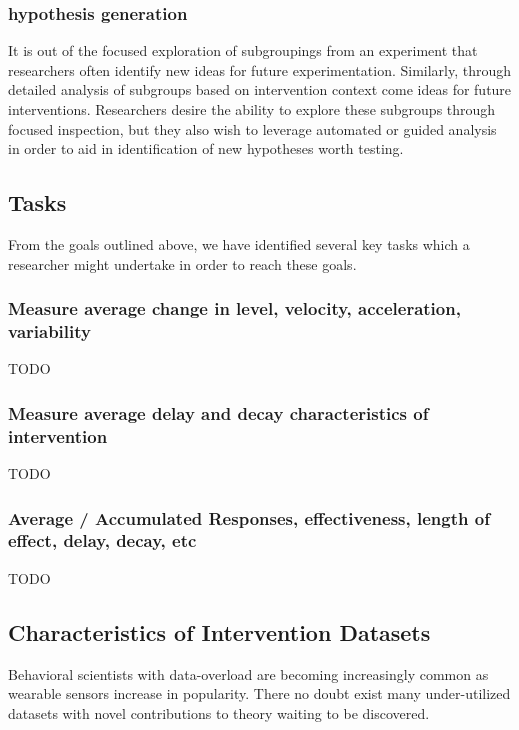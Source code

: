 \documentclass[review,journal]{vgtc}         %
\begin{document}
\subsubsection{hypothesis generation}
It is out of the focused exploration of subgroupings from an experiment that researchers often identify new ideas for future experimentation.
Similarly, through detailed analysis of subgroups based on intervention context come ideas for future interventions.
Researchers desire the ability to explore these subgroups through focused inspection, but they also wish to leverage automated or guided analysis in order to aid in identification of new hypotheses worth testing.

\subsection{Tasks}
From the goals outlined above, we have identified several key tasks which a researcher might undertake in order to reach these goals.

\subsubsection{Measure average change in level, velocity, acceleration, variability}
TODO

\subsubsection{Measure average delay and decay characteristics of intervention}
TODO

\subsubsection{Average / Accumulated Responses, effectiveness, length of effect, delay, decay, etc}
TODO

\subsection{Characteristics of Intervention Datasets}

Behavioral scientists with data-overload are becoming increasingly common as wearable sensors increase in popularity.
There no doubt exist many under-utilized datasets with novel contributions to theory waiting to be discovered.
\end{document}
